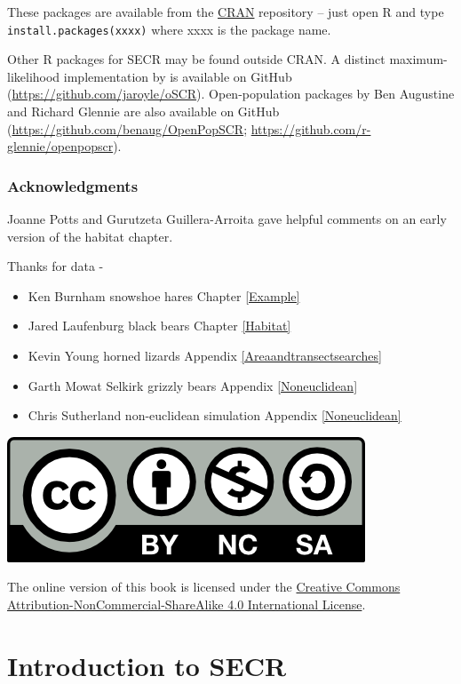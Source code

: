 \documentclass[
]{book}
\providecommand{\tightlist}{%
  \setlength{\itemsep}{0pt}\setlength{\parskip}{0pt}}
\begin{document}
These packages are available from the \href{https://cran.r-project.org/}{CRAN} repository -- just open R and type \texttt{install.packages(\textquotesingle{}xxxx\textquotesingle{})} where xxxx is the package name.

Other R packages for SECR may be found outside CRAN. A distinct maximum-likelihood implementation by \citet{srl19} is available on GitHub (\url{https://github.com/jaroyle/oSCR}). Open-population packages by Ben Augustine and Richard Glennie are also available on GitHub (\url{https://github.com/benaug/OpenPopSCR}; \url{https://github.com/r-glennie/openpopscr}).

\section*{Acknowledgments}\label{acknowledgments}

Joanne Potts and Gurutzeta Guillera-Arroita gave helpful comments on an early version of the habitat chapter.

Thanks for data -

\begin{itemize}
\tightlist
\item
  Ken Burnham snowshoe hares Chapter \ref{Example}
\item
  Jared Laufenburg black bears Chapter \ref{Habitat}
\item
  Kevin Young horned lizards Appendix \ref{Areaandtransectsearches}
\item
  Garth Mowat Selkirk grizzly bears Appendix \ref{Noneuclidean}
\item
  Chris Sutherland non-euclidean simulation Appendix \ref{Noneuclidean}
\end{itemize}

\includegraphics[width=0.15\linewidth]{figures/by-nc-sa}

The online version of this book is licensed under the \href{https://creativecommons.org/licenses/by-nc-sa/4.0/}{Creative Commons Attribution-NonCommercial-ShareAlike 4.0 International License}.

\part*{Introduction to SECR}\label{part-introduction-to-secr}
\end{document}
